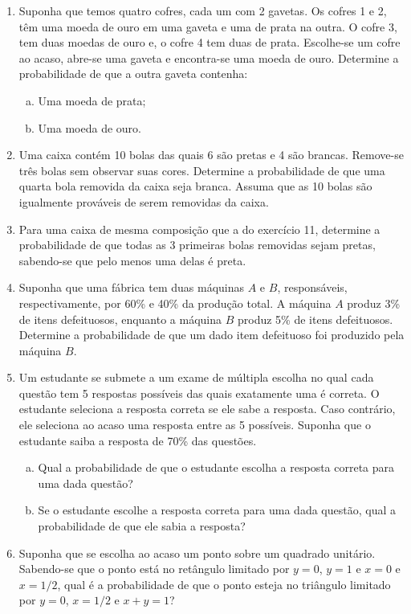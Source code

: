 \documentclass[../Notas.tex]{subfiles}
\begin{document}
\begin{enumerate}
    \item Suponha que temos quatro cofres, cada um com 2 gavetas. Os cofres 1 e 2, têm uma moeda de ouro em uma gaveta e uma de prata na outra. O cofre 3, tem duas moedas de ouro e, o cofre 4 tem duas de prata. Escolhe-se um cofre ao acaso, abre-se uma gaveta e encontra-se uma moeda de ouro. Determine a probabilidade de que a outra gaveta contenha: 
    \begin{enumerate}[a)]
    \item Uma moeda de prata;
    \item Uma moeda de ouro.
    \end{enumerate}
    \item Uma caixa contém 10 bolas das quais 6 são pretas e 4 são brancas. Remove-se três bolas sem observar suas cores. Determine a probabilidade de que uma quarta bola removida da caixa seja branca. Assuma que as 10 bolas são igualmente prováveis de serem removidas da caixa.
    \item Para uma caixa de mesma composição que a do exercício 11, determine a probabilidade de que todas as 3 primeiras bolas removidas sejam pretas, sabendo-se que pelo menos uma delas é preta.
    \item Suponha que uma fábrica tem duas máquinas $A$ e $B$, responsáveis, respectivamente, por 60\% e 40\% da produção total. A máquina $A$ produz 3\% de itens defeituosos, enquanto a máquina $B$ produz 5\% de itens defeituosos. Determine a probabilidade de que um dado item defeituoso foi produzido pela máquina $B$.
    \item Um estudante se submete a um exame de múltipla escolha no qual cada questão tem 5 respostas possíveis das quais exatamente uma é correta. O estudante seleciona a resposta correta se ele sabe a resposta. Caso contrário, ele seleciona ao acaso uma resposta entre as 5 possíveis. Suponha que o estudante saiba a resposta de 70\% das questões.
    \begin{enumerate}[a)]
    \item Qual a probabilidade de que o estudante escolha a resposta correta para uma dada questão?
    \item Se o estudante escolhe a resposta correta para uma dada questão, qual a probabilidade de que ele sabia a resposta?
    \end{enumerate}
    \item Suponha que se escolha ao acaso um ponto sobre um quadrado unitário. Sabendo-se que o ponto está no retângulo limitado por $y = 0$, $y = 1$ e $x = 0$ e $x = 1/2$, qual é a probabilidade de que o ponto esteja no triângulo limitado por $y = 0$, $x = 1/2$ e $x + y = 1$?

\end{enumerate}
\end{document}

